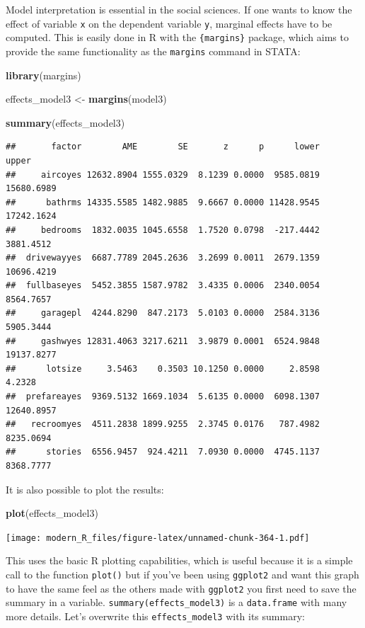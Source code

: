 \documentclass[]{gitbook}
\newenvironment{Shaded}{\begin{snugshade}}{\end{snugshade}}
\newcommand{\KeywordTok}[1]{\textcolor[rgb]{0.13,0.29,0.53}{\textbf{#1}}}
\newcommand{\NormalTok}[1]{#1}
\newcommand{\StringTok}[1]{\textcolor[rgb]{0.31,0.60,0.02}{#1}}
\theoremstyle{definition}
\theoremstyle{definition}
\theoremstyle{definition}
\theoremstyle{remark}
\begin{document}
Model interpretation is essential in the social sciences. If one wants
to know the effect of variable \texttt{x} on the dependent variable
\texttt{y}, marginal effects have to be computed. This is easily done in
R with the \texttt{\{margins\}} package, which aims to provide the same
functionality as the \texttt{margins} command in STATA:

\begin{Shaded}
\begin{Highlighting}[]
\KeywordTok{library}\NormalTok{(margins)}

\NormalTok{effects_model3 <-}\StringTok{ }\KeywordTok{margins}\NormalTok{(model3)}

\KeywordTok{summary}\NormalTok{(effects_model3)}
\end{Highlighting}
\end{Shaded}

\begin{verbatim}
##       factor        AME        SE       z      p      lower      upper
##     aircoyes 12632.8904 1555.0329  8.1239 0.0000  9585.0819 15680.6989
##      bathrms 14335.5585 1482.9885  9.6667 0.0000 11428.9545 17242.1624
##     bedrooms  1832.0035 1045.6558  1.7520 0.0798  -217.4442  3881.4512
##  drivewayyes  6687.7789 2045.2636  3.2699 0.0011  2679.1359 10696.4219
##  fullbaseyes  5452.3855 1587.9782  3.4335 0.0006  2340.0054  8564.7657
##     garagepl  4244.8290  847.2173  5.0103 0.0000  2584.3136  5905.3444
##     gashwyes 12831.4063 3217.6211  3.9879 0.0001  6524.9848 19137.8277
##      lotsize     3.5463    0.3503 10.1250 0.0000     2.8598     4.2328
##  prefareayes  9369.5132 1669.1034  5.6135 0.0000  6098.1307 12640.8957
##   recroomyes  4511.2838 1899.9255  2.3745 0.0176   787.4982  8235.0694
##      stories  6556.9457  924.4211  7.0930 0.0000  4745.1137  8368.7777
\end{verbatim}

It is also possible to plot the results:

\begin{Shaded}
\begin{Highlighting}[]
\KeywordTok{plot}\NormalTok{(effects_model3)}
\end{Highlighting}
\end{Shaded}

\texttt{[image: modern\_R\_files/figure-latex/unnamed-chunk-364-1.pdf]}

This uses the basic R plotting capabilities, which is useful because it
is a simple call to the function \texttt{plot()} but if you've been
using \texttt{ggplot2} and want this graph to have the same feel as the
others made with \texttt{ggplot2} you first need to save the summary in
a variable. \texttt{summary(effects\_model3)} is a \texttt{data.frame}
with many more details. Let's overwrite this \texttt{effects\_model3}
with its summary:
\end{document}
